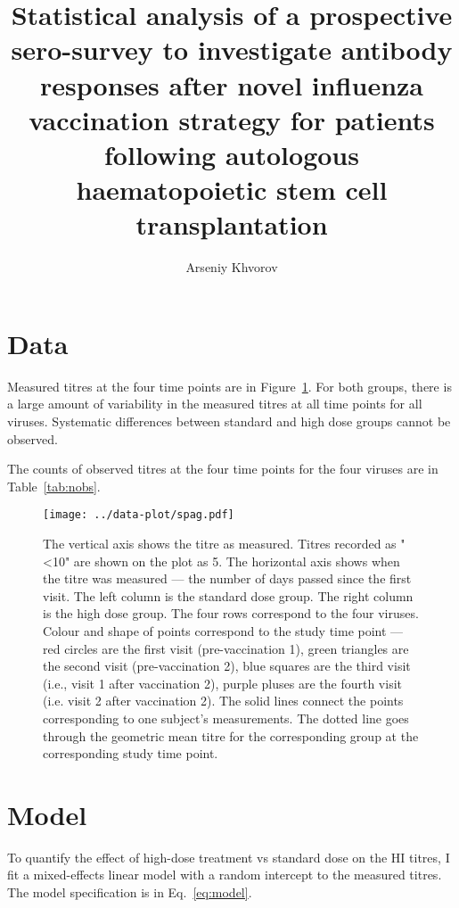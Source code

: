 \documentclass[11pt]{article}
\title{Statistical analysis of a prospective sero-survey to investigate
antibody responses
after novel influenza vaccination strategy
for patients following autologous
haematopoietic stem cell transplantation}
\author{Arseniy Khvorov}
\begin{document}
\maketitle

\section{Data}

Measured titres at the four time points are in Figure~\ref{fig:spag}.
For both groups, there is a large amount of variability in the measured titres
at all time points for all viruses. Systematic differences between standard and
high dose groups cannot be observed.

The counts of observed titres at the four time points for the four viruses are
in Table~\ref{tab:nobs}.



\begin{figure}[htp]
    \centering
    \texttt{[image: ../data-plot/spag.pdf]}
    \caption{
        The vertical axis shows the titre as measured.
        Titres recorded as "<10" are shown on the plot as 5.
        The horizontal axis shows when the titre was measured --- the number of
        days passed since the first visit.
        The left column is the standard dose group.
        The right column is the high dose group.
        The four rows correspond to the four viruses.
        Colour and shape of points correspond to the study time point ---
        red circles are the first visit (pre-vaccination 1),
        green triangles are the second visit (pre-vaccination 2),
        blue squares are the third visit (i.e., visit 1 after vaccination 2),
        purple pluses are the fourth visit (i.e. visit 2 after vaccination 2).
        The solid lines connect the points
        corresponding to one subject's measurements.
        The dotted line goes through the geometric mean titre for the
        corresponding group at the corresponding study time point.
    }
    \label{fig:spag}
\end{figure}

\section{Model}

To quantify the effect of high-dose treatment vs standard dose on the
HI titres, I fit a mixed-effects linear model with a random intercept
to the measured titres.
The model specification is in Eq.~\ref{eq:model}.
\end{document}
